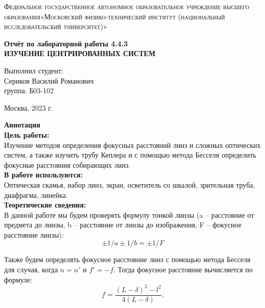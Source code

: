 \documentclass[a4paper, 12pt]{article}%
\begin{document}
	\begin{titlepage}
		\begin{center}
			\textsc{Федеральное государственное автономное образовательное учреждение высшего образования«Московский физико-технический институт (национальный исследовательский университет)»\\[5mm]
			}
			
			\vfill
			
			\textbf{Отчёт по лабораторной работы 4.4.3\\[3mm]
				ИЗУЧЕНИЕ ЦЕНТРИРОВАННЫХ СИСТЕМ 
				\\[50mm]
			}
			
		\end{center}
		
		\hfill
		\begin{minipage}{.5\textwidth}
			Выполнил студент:\\[2mm]
			Сериков Василий Романович\\[2mm]
			группа: Б03-102\\[5mm]
			
		\end{minipage}
		\vfill
		\begin{center}
			Москва, 2023 г.
		\end{center}
		
	\end{titlepage}
	
	\newpage
	\textbf{Аннотация}\\
	
	
	\textbf{Цель работы: }\\
	Изучение методов определения фокусных расстояний линз и сложных оптических систем, а также изучить трубу Кеплера и с помощью метода Бесселя определить фокусные расстояния собирающих линз.\\
	
	\textbf{В работе используются: }\\ 
	 Оптическая скамья, набор линз, экран, осветитель со шкалой, зрительная труба, диафрагма, линейка.\\
	 
	 \textbf{Теоретические сведения: } \\
	 В данной работе мы будем проверять формулу тонкой линзы (a -- расстояние от предмета до линзы, b -- расстояние от линзы до изображения, F -- фокусное расстояние линзы): $$ \pm1/a \pm 1/b = \pm1/F $$
	 
	 Также будем определять фокусное расстояние линз с помощью метода Бесселя для случая, когда $n = n'$ и $f' = -f$. Тогда фокусное расстояние вычисляется по формуле:
	 \begin{equation}\label{Bessel}
	 	f = \frac{(L - \delta)^2 - l^2}{4(L-\delta)}.
	 \end{equation}
 
\end{document}
